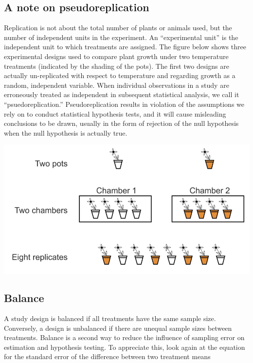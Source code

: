 \documentclass[]{book}
\begin{document}
\hypertarget{a-note-on-pseudoreplication}{%
\subsection{A note on pseudoreplication}\label{a-note-on-pseudoreplication}}

Replication is not about the total number of plants or animals used, but the number of independent units in the experiment. An ``experimental unit'' is the independent unit to which treatments are assigned. The figure below shows three experimental designs used to compare plant growth under two temperature treatments (indicated by the shading of the pots). The first two designs are actually un-replicated with respect to temperature and regarding growth as a random, independent variable. When individual observations in a study are erroneously treated as independent in subsequent statistical analysis, we call it ``psuedoreplication.'' Pseudoreplication results in violation of the assumptions we rely on to conduct statistical hypothesis tests, and it will cause misleading conclusions to be drawn, usually in the form of rejection of the null hypothesis when the null hypothesis is actually true.

\includegraphics[width=13.03in]{images/images_6a.006}

\hypertarget{balance}{%
\subsection{Balance}\label{balance}}

A study design is balanced if all treatments have the same sample size. Conversely, a design is unbalanced if there are unequal sample sizes between treatments. Balance is a second way to reduce the influence of sampling error on estimation and hypothesis testing. To appreciate this, look again at the equation for the standard error of the difference between two treatment means
\end{document}
